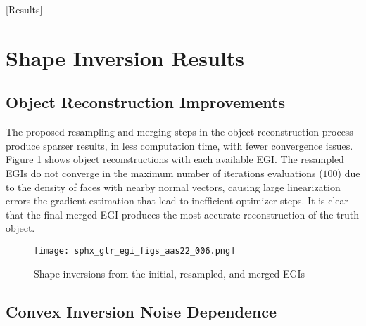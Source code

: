 [Results]
\graphicspath{{/Users/liamrobinson/Documents/PyLightCurves/docs/build/html/_images}}

\section{Shape Inversion Results}


\clearpage

\subsection{Object Reconstruction Improvements}

The proposed resampling and merging steps in the object reconstruction process produce sparser results, in less computation time, with fewer convergence issues. Figure \ref{fig:egi_reconstructions} shows object reconstructions with each available EGI. The resampled EGIs do not converge in the maximum number of iterations evaluations ($100$) due to the density of faces with nearby normal vectors, causing large linearization errors the gradient estimation that lead to inefficient optimizer steps. It is clear that the final merged EGI produces the most accurate reconstruction of the truth object.

\begin{figure}[!htb]
  \centering
  \texttt{[image: sphx\_glr\_egi\_figs\_aas22\_006.png]}
  \caption{Shape inversions from the initial, resampled, and merged EGIs}
  \label{fig:egi_reconstructions}
\end{figure}

\clearpage

\subsection{Convex Inversion Noise Dependence}

